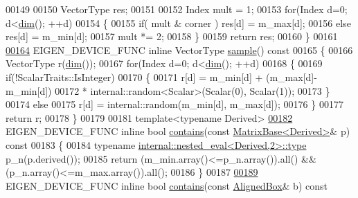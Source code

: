 \begin{DoxyCode}
00149 
00150     VectorType res;
00151 
00152     Index mult = 1;
00153     \textcolor{keywordflow}{for}(Index d=0; d<\hyperlink{group___geometry___module_ab774df3608d0be913a3aa5d67476a521}{dim}(); ++d)
00154     \{
00155       \textcolor{keywordflow}{if}( mult & corner ) res[d] = m\_max[d];
00156       \textcolor{keywordflow}{else}                res[d] = m\_min[d];
00157       mult *= 2;
00158     \}
00159     \textcolor{keywordflow}{return} res;
00160   \}
00161 
\hyperlink{group___geometry___module_a3cd54685b5378b5e77fa2c62ca7e2797}{00164}   EIGEN\_DEVICE\_FUNC \textcolor{keyword}{inline} VectorType \hyperlink{group___geometry___module_a3cd54685b5378b5e77fa2c62ca7e2797}{sample}()\textcolor{keyword}{ const}
00165 \textcolor{keyword}{  }\{
00166     VectorType r(\hyperlink{group___geometry___module_ab774df3608d0be913a3aa5d67476a521}{dim}());
00167     \textcolor{keywordflow}{for}(Index d=0; d<\hyperlink{group___geometry___module_ab774df3608d0be913a3aa5d67476a521}{dim}(); ++d)
00168     \{
00169       \textcolor{keywordflow}{if}(!ScalarTraits::IsInteger)
00170       \{
00171         r[d] = m\_min[d] + (m\_max[d]-m\_min[d])
00172              * internal::random<Scalar>(Scalar(0), Scalar(1));
00173       \}
00174       \textcolor{keywordflow}{else}
00175         r[d] = internal::random(m\_min[d], m\_max[d]);
00176     \}
00177     \textcolor{keywordflow}{return} r;
00178   \}
00179 
00181   \textcolor{keyword}{template}<\textcolor{keyword}{typename} Derived>
\hyperlink{group___geometry___module_a1882f21e5e56c877ea35505644ef5833}{00182}   EIGEN\_DEVICE\_FUNC \textcolor{keyword}{inline} \textcolor{keywordtype}{bool} \hyperlink{group___geometry___module_a1882f21e5e56c877ea35505644ef5833}{contains}(\textcolor{keyword}{const} \hyperlink{group___core___module_class_eigen_1_1_matrix_base}{MatrixBase<Derived>}& p)\textcolor{keyword}{ const}
00183 \textcolor{keyword}{  }\{
00184     \textcolor{keyword}{typename} \hyperlink{class_eigen_1_1internal_1_1_tensor_lazy_evaluator_writable}{internal::nested\_eval<Derived,2>::type} p\_n(p.derived());
00185     \textcolor{keywordflow}{return} (m\_min.array()<=p\_n.array()).all() && (p\_n.array()<=m\_max.array()).all();
00186   \}
00187 
\hyperlink{group___geometry___module_aadae71332cb6be09f93150edb1b6f99a}{00189}   EIGEN\_DEVICE\_FUNC \textcolor{keyword}{inline} \textcolor{keywordtype}{bool} \hyperlink{group___geometry___module_aadae71332cb6be09f93150edb1b6f99a}{contains}(\textcolor{keyword}{const} \hyperlink{group___geometry___module_class_eigen_1_1_aligned_box}{AlignedBox}& b)\textcolor{keyword}{ const}

\end{DoxyCode}
